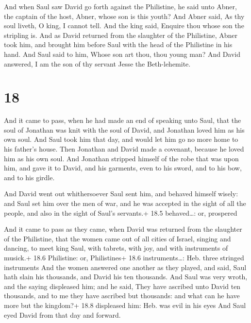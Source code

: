 And when Saul saw David go forth against the Philistine,
he said unto Abner, the captain of the host, Abner, whose son is this
youth? And Abner said, As thy soul liveth, O king, I cannot tell.
 And the king said, Enquire thou whose son the stripling
is.  And as David returned from the slaughter of the
Philistine, Abner took him, and brought him before Saul with the head of
the Philistine in his hand.  And Saul said to him, Whose
son art thou, thou young man? And David answered, I am the son of thy
servant Jesse the Beth-lehemite.

\hypertarget{section-17}{%
\section{18}\label{section-17}}

 And it came to pass, when he had made an end of speaking
unto Saul, that the soul of Jonathan was knit with the soul of David,
and Jonathan loved him as his own soul.  And Saul took him
that day, and would let him go no more home to his father's house.
 Then Jonathan and David made a covenant, because he loved
him as his own soul.  And Jonathan stripped himself of the
robe that was upon him, and gave it to David, and his garments, even to
his sword, and to his bow, and to his girdle.

 And David went out whithersoever Saul sent him, and
behaved himself wisely: and Saul set him over the men of war, and he was
accepted in the sight of all the people, and also in the sight of Saul's
servants.+ 18.5 behaved\ldots: or, prospered

 And it came to pass as they came, when David was returned
from the slaughter of the Philistine, that the women came out of all
cities of Israel, singing and dancing, to meet king Saul, with tabrets,
with joy, and with instruments of musick.+ 18.6 Philistine: or,
Philistines+ 18.6 instruments\ldots: Heb. three stringed instruments
 And the women answered one another as they played, and
said, Saul hath slain his thousands, and David his ten thousands.
 And Saul was very wroth, and the saying displeased him; and
he said, They have ascribed unto David ten thousands, and to me they
have ascribed but thousands: and what can he have more but the kingdom?+
18.8 displeased him: Heb. was evil in his eyes  And Saul
eyed David from that day and forward.

